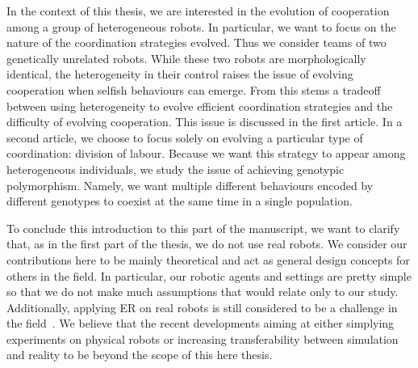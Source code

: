   In the context of this thesis, we are interested in the evolution of cooperation among a group of heterogeneous robots. In particular, we want to focus on the nature of the coordination strategies evolved. Thus we consider teams of two genetically unrelated robots. While these two robots are morphologically identical, the heterogeneity in their control raises the issue of evolving cooperation when selfish behaviours can emerge. From this stems a tradeoff between using heterogeneity to evolve efficient coordination strategies and the difficulty of evolving cooperation. This issue is discussed in the first article. In a second article, we choose to focus solely on evolving a particular type of coordination: division of labour. Because we want this strategy to appear among heterogeneous individuals, we study the issue of achieving genotypic polymorphism. Namely, we want multiple different behaviours encoded by different genotypes to coexist at the same time in a single population.

  To conclude this introduction to this part of the manuscript, we want to clarify that, as in the first part of the thesis, we do not use real robots. We consider our contributions here to be mainly theoretical and act as general design concepts for others in the field. In particular, our robotic agents and settings are pretty simple so that we do not make much assumptions that would relate only to our study. Additionally, applying ER on real robots is still considered to be a challenge in the field~\parencite{Floreano2008, Doncieux2015a}. We believe that the recent developments aiming at either simplying experiments on physical robots or increasing transferability between simulation and reality to be beyond the scope of this here thesis. 


